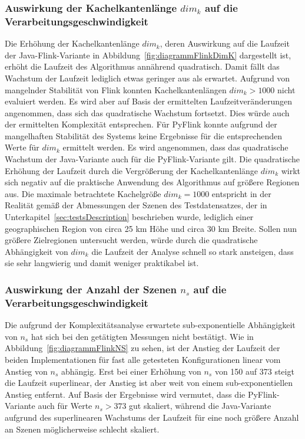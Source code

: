 \subsubsection{Auswirkung der Kachelkantenlänge $dim_k$ auf die Verarbeitungsgeschwindigkeit}
Die Erhöhung der Kachelkantenlänge $dim_k$, deren Auswirkung auf die Laufzeit der Java-Flink-Variante in Abbildung~\ref{fig:diagrammFlinkDimK} dargestellt ist, erhöht die Laufzeit des Algorithmus annährend quadratisch. Damit fällt das Wachstum der Laufzeit lediglich etwas geringer aus als erwartet. Aufgrund von mangelnder Stabilität von Flink konnten Kachelkantenlängen $dim_k > 1000$ nicht evaluiert werden. Es wird aber auf Basis der ermittelten Laufzeitveränderungen angenommen, dass sich das quadratische Wachstum fortsetzt. Dies würde auch der ermittelten Komplexität entsprechen. Für PyFlink konnte aufgrund der mangelhaften Stabilität des Systems keine Ergebnisse für die entsprechenden Werte für $dim_k$ ermittelt werden. Es wird angenommen, dass das quadratische Wachstum der Java-Variante auch für die PyFlink-Variante gilt.
Die quadratische Erhöhung der Laufzeit durch die Vergrößerung der Kachelkantenlänge $dim_k$ wirkt sich negativ auf die praktische Anwendung des Algorithmus auf größere Regionen aus. Die maximale betrachtete Kachelgröße $dim_k = 1000$ entspricht in der Realität gemäß der Abmessungen der Szenen des Testdatensatzes, der in Unterkapitel~\ref{sec:testsDescription} beschrieben wurde, lediglich einer geographischen Region von circa 25 km Höhe und circa 30 km Breite. Sollen nun größere Zielregionen untersucht werden, würde durch die quadratische Abhängigkeit von $dim_k$ die Laufzeit der Analyse schnell so stark ansteigen, dass sie sehr langwierig und damit weniger praktikabel ist. 

\subsubsection{Auswirkung der Anzahl der Szenen $n_s$ auf die Verarbeitungsgeschwindigkeit}
Die aufgrund der Komplexitätsanalyse erwartete sub-exponentielle Abhängigkeit von $n_s$ hat sich bei den getätigten Messungen nicht bestätigt. Wie in Abbildung~\ref{fig:diagrammFlinkNS} zu sehen, ist der Anstieg der Laufzeit der beiden Implementationen für fast alle getesteten Konfigurationen linear vom Anstieg von $n_s$ abhängig. Erst bei einer Erhöhung von $n_s$ von 150 auf 373 steigt die Laufzeit superlinear, der Anstieg ist aber weit von einem sub-exponentiellen Anstieg entfernt. Auf Basis der Ergebnisse wird vermutet, dass die PyFlink-Variante auch für Werte $n_s > 373$ gut skaliert, während die Java-Variante aufgrund des superlinearen Wachstums der Laufzeit für eine noch größere Anzahl an Szenen möglicherweise schlecht skaliert. 

